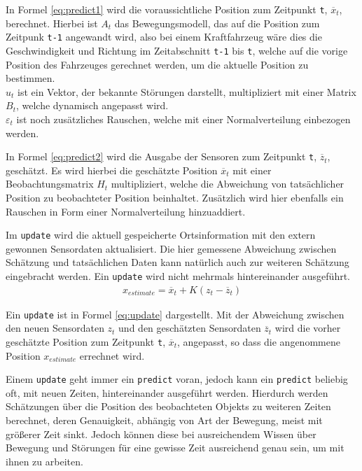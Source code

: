 \documentclass[12pt,a4paper,ngerman]{scrartcl}
\begin{document}
In Formel \eqref{eq:predict1} wird die voraussichtliche Position zum Zeitpunkt {\tt t}, $\overline{x}_{t}$, berechnet. Hierbei ist $A_{t}$ das Bewegungsmodell, das auf die Position zum Zeitpunk {\tt t-1} angewandt wird, also bei einem Kraftfahrzeug wäre dies die Geschwindigkeit und Richtung im Zeitabschnitt {\tt t-1} bis {\tt t}, welche auf die vorige Position des Fahrzeuges gerechnet werden, um die aktuelle Position zu bestimmen.\\
$u_{t}$ ist ein Vektor, der bekannte Störungen darstellt, multipliziert mit einer Matrix $B_{t}$, welche dynamisch angepasst wird.\\
$\varepsilon_{t}$ ist noch zusätzliches Rauschen, welche mit einer Normalverteilung einbezogen werden.

In Formel \eqref{eq:predict2} wird die Ausgabe der Sensoren zum Zeitpunkt {\tt t}, $\overline{z}_{t}$, geschätzt. Es wird hierbei die geschätzte Position $\overline{x}_{t}$ mit einer Beobachtungsmatrix $H_{t}$ multipliziert, welche die Abweichung von tatsächlicher Position zu beobachteter Position beinhaltet. Zusätzlich wird hier ebenfalls ein Rauschen in Form einer Normalverteilung hinzuaddiert.

Im {\tt update} wird die aktuell gespeicherte Ortsinformation mit den extern gewonnen Sensordaten aktualisiert. Die hier gemessene Abweichung zwischen Schätzung und tatsächlichen Daten kann natürlich auch zur weiteren Schätzung eingebracht werden. Ein {\tt update} wird nicht mehrmals hintereinander ausgeführt.
\begin{align}
x_{estimate} = \overline{x}_{t} + K(z_{t} - \overline{z}_{t}) \label{eq:update}
\end{align}

Ein {\tt update} ist in Formel \eqref{eq:update} dargestellt. Mit der Abweichung zwischen den neuen Sensordaten $z_{t}$ und den geschätzten Sensordaten $\overline{z}_{t}$ wird die vorher geschätzte Position zum Zeitpunkt {\tt t}, $\overline{x}_{t}$, angepasst, so dass die angenommene Position $x_{estimate}$ errechnet wird.

Einem {\tt update} geht immer ein {\tt predict} voran, jedoch kann ein {\tt predict} beliebig oft, mit neuen Zeiten, hintereinander ausgeführt werden. Hierdurch werden Schätzungen über die Position des beobachteten Objekts zu weiteren Zeiten berechnet, deren Genauigkeit, abhängig von Art der Bewegung, meist mit größerer Zeit sinkt. Jedoch können diese bei ausreichendem Wissen über Bewegung und Störungen für eine gewisse Zeit ausreichend genau sein, um mit ihnen zu arbeiten.
\end{document}
